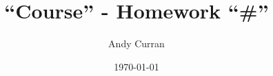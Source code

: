 \documentclass{article}
\begin{document}
\title{``Course'' - Homework ``\#''}
\author{Andy Curran}
\date{\today}
\maketitle
\end{document}
